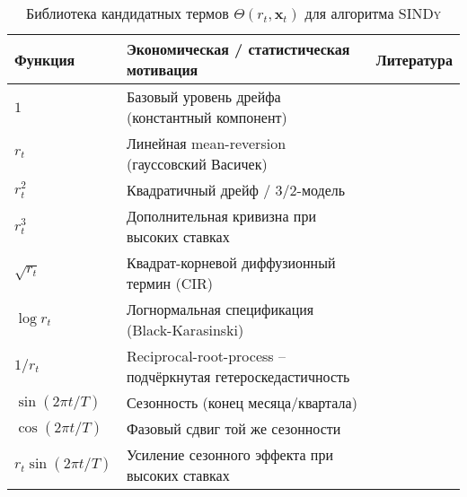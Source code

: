 \begin{table}[htbp]
\small                         
\centering
\caption{Библиотека кандидатных термов $\Theta(r_t,\mathbf{x}_t)$ для алгоритма \textsc{SINDy}}
\label{tab:sindy-library}
\renewcommand{\arraystretch}{1.15}
\begin{tabularx}{\textwidth}{@{}l>{\raggedright\arraybackslash}X>{\raggedright\arraybackslash}m{2.8cm}@{}}
\toprule
\textbf{Функция} & \textbf{Экономическая / статистическая мотивация} & \textbf{Литература} \\
\midrule
$1$                                   & Базовый уровень дрейфа (константный компонент)                                          & \cite{Vasicek1977,HullWhite1990} \\[2pt]
$r_t$                                 & Линейная mean-reversion (гауссовский Васичек)                                            & \cite{Vasicek1977} \\[2pt]
$r_t^{2}$                             & Квадратичный дрейф / 3/2-модель                                                         & \cite{Rogers2024threehalf,Chan1992} \\[2pt]
$r_t^{3}$                             & Дополнительная кривизна при высоких ставках                                              & \cite{Rogers2024threehalf} \\[2pt]
$\sqrt{r_t}$                          & Квадрат-корневой диффузионный термин (CIR)                                               & \cite{CIR1985} \\[2pt]
$\log r_t$                            & Логнормальная спецификация (Black-Karasinski)                                            & \cite{BlackKarasinski1991} \\[2pt]
$1/r_t$                               & Reciprocal-root-process -- подчёркнутая гетероскедастичность                               & \cite{Andersen2005} \\[2pt]
\midrule
$\sin(2\pi t/T)$                      & Сезонность (конец месяца/квартала)                                                      & \cite{Beltran2024,Jha2025} \\[2pt]
$\cos(2\pi t/T)$                      & Фазовый сдвиг той же сезонности                                                         & \cite{Beltran2024,Jha2025} \\[2pt]
$r_t\sin(2\pi t/T)$                   & Усиление сезонного эффекта при высоких ставках                                           & \cite{Beltran2024} \\[2pt]

\end{tabularx}
\end{table}
